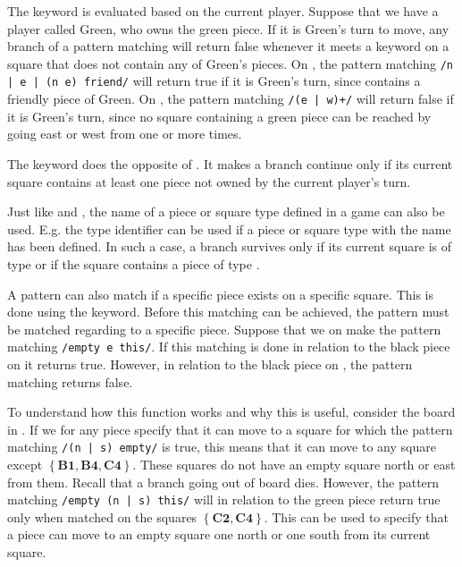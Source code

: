 The  keyword is evaluated based on the current player. Suppose
that we have a player called Green, who owns the green piece. If it is Green's
turn to move, any branch of a pattern matching will return false whenever it
meets a keyword  on a square that does not contain any of Green's
pieces. On , the pattern matching \texttt{/n | e | (n e) friend/}
will return true if it is Green's turn, since  contains a friendly
piece of Green. On , the pattern matching \texttt{/(e | w)+/} will
return false if it is Green's turn, since no square containing a green piece can
be reached by going east or west from  one or more times.

The  keyword does the opposite of . It makes a branch
continue only if its current square contains at least one piece not owned by the
current player's turn.

Just like  and , the name of a piece or square type
defined in a \productname{} game can also be used. E.g. the type identifier
 can be used if a piece or square type with the name has been
defined. In such a case, a branch survives only if its current square is of type
 or if the square contains a piece of type .

A pattern can also match if a specific piece exists on a specific square. This
is done using the  keyword. Before this matching can be achieved,
the pattern must be matched regarding to a specific piece. Suppose that we on
 make the pattern matching \texttt{/empty e this/}. If this matching
is done in relation to the black piece on  it returns true. However,
in relation to the black piece on , the pattern matching returns
false. 

To understand how this function works and why this is useful, consider
the board in . If we for any piece specify that it can
move to a square for which the pattern matching \texttt{/(n | s) empty/} is
true, this means that it can move to any square except $\mathbf{\left\{B1, B4,
C4\right\}}$. These squares do not have an empty square north or east from them.
Recall that a branch going out of board dies.  However, the pattern matching
\texttt{/empty (n | s) this/} will in relation to the green piece return true
only when matched on the squares $\mathbf{\left\{ C2, C4\right\}}$.  This can be
used to specify that a piece can move to an empty square one north or one south
from its current square. 

